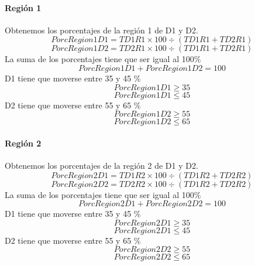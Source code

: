 \paragraph{Región 1} Obtenemos los porcentajes de la región 1 de D1 y D2.  
\begin{equation}
PorcRegion1D1 = TD1R1 \times 100 \div (TD1R1 + TD2R1)
\end{equation}
\begin{equation}
PorcRegion1D2 = TD2R1 \times 100 \div (TD1R1 + TD2R1)
\end{equation}
La suma de los porcentajes tiene que ser igual al 100\%
\begin{equation}
PorcRegion1D1 + PorcRegion1D2 = 100
\end{equation}
D1 tiene que moverse entre 35 y 45 \%
\begin{equation}
PorcRegion1D1 \geq 35
\end{equation}
\begin{equation}
PorcRegion1D1 \leq 45
\end{equation}
D2 tiene que moverse entre 55 y 65 \%
\begin{equation}
PorcRegion1D2 \geq 55
\end{equation}
\begin{equation}
PorcRegion1D2 \leq 65
\end{equation}
\paragraph{Región 2} Obtenemos los porcentajes de la región 2 de D1 y D2.  
\begin{equation}
PorcRegion2D1 = TD1R2 \times 100 \div (TD1R2 + TD2R2)
\end{equation}
\begin{equation}
PorcRegion2D2 = TD2R2 \times 100 \div (TD1R2 + TD2R2)
\end{equation}
La suma de los porcentajes tiene que ser igual al 100\%
\begin{equation}
PorcRegion2D1 + PorcRegion2D2 = 100
\end{equation}
D1 tiene que moverse entre 35 y 45 \%
\begin{equation}
PorcRegion2D1 \geq 35
\end{equation}
\begin{equation}
PorcRegion2D1 \leq 45
\end{equation}
D2 tiene que moverse entre 55 y 65 \%
\begin{equation}
PorcRegion2D2 \geq 55
\end{equation}
\begin{equation}
PorcRegion2D2 \leq 65
\end{equation}
